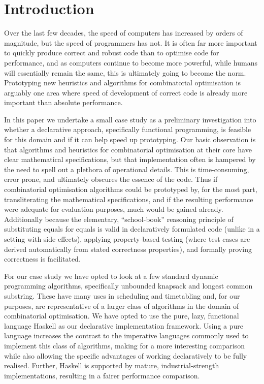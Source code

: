 \section{Introduction}

Over the last few decades, the speed of computers has increased by orders of
magnitude, but the speed of programmers has not. It is often far more
important to quickly produce correct and robust code than to optimise code for
performance, and as computers continue to become more powerful, while humans
will essentially remain the same, this is ultimately going to become the norm.
Prototyping new heuristics and algorithms for combinatorial optimisation is
arguably one area where speed of development of correct code is already more
important than absolute performance.

In this paper we undertake a small case study as a preliminary investigation
into whether a declarative approach, specifically functional programming, is
feasible for this domain and if it can help speed up prototyping. Our
basic observation is that algorithms and heuristics for combinatorial
optimisation at their core have clear mathematical specifications, but that
implementation often is hampered by the need to spell out a plethora of
operational details. This is time-consuming, error prone, and ultimately
obscures the essence of the code. Thus if combinatorial optimisation
algorithms could be prototyped by, for the most part, transliterating the
mathematical specifications, and if the resulting performance were adequate
for evaluation purposes, much would be gained already.
Additionally because the elementary, ``school-book'' reasoning principle of
substituting equals for equals is valid in declaratively formulated code
(unlike in a setting with side effects), applying property-based testing
\cite{quickcheck} (where test cases are derived automatically from stated
correctness properties), and formally proving correctness is facilitated.

For our case study we have opted to look at a few standard dynamic
programming algorithms, specifically unbounded knapsack and longest common substring. These have
many uses in scheduling and timetabling and, for our purposes, are
representative of a larger class of algorithms in the domain of combinatorial
optimisation. We have opted to
use the pure, lazy, functional language Haskell \cite{Haskell98Book} as our declarative implementation framework. Using a pure language increases the contrast to the imperative languages commonly used
to implement this class of algorithms, making for a more interesting
comparison while also allowing the specific advantages of working
declaratively
to be fully realised. Further, Haskell is supported by mature,
industrial-strength implementations, resulting in a fairer performance
comparison.

